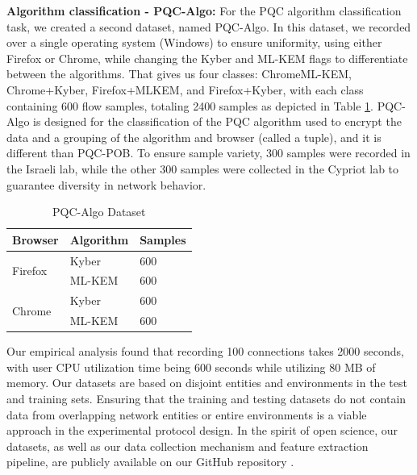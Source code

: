 \documentclass[10pt,journal]{IEEEtran}%
\begin{document}
    
     \textbf{Algorithm classification - PQC-Algo:} For the PQC algorithm classification task, we created a second dataset, named PQC-Algo. In this dataset, we recorded over a single operating system (Windows) to ensure uniformity, using either Firefox or Chrome, while changing the Kyber and ML-KEM flags to differentiate between the algorithms. That gives us four classes: ChromeML-KEM, Chrome+Kyber, Firefox+MLKEM, and Firefox+Kyber, with each class containing 600 flow samples, totaling 2400 samples as depicted in Table \ref{tab:pqcalgo}.    
    PQC-Algo is designed for the classification of the PQC algorithm used to encrypt the data and a grouping of the algorithm and browser (called a tuple), and it is different than PQC-POB. To ensure sample variety, 300 samples were recorded in the Israeli lab, while the other 300 samples were collected in the Cypriot lab to guarantee diversity in network behavior.

\begin{table}[h]
\centering
\caption{PQC-Algo Dataset}
\vspace{1.5mm}

\begin{tabular}{|p{2cm}|p{2cm}|p{1.2cm}|}
\hline
\textbf{Browser}      & \textbf{Algorithm} & \textbf{Samples}\\ \hline \hline
\multirow{2}{*}{Firefox} & Kyber & 600 \\ \cline{2-3}
                         & ML-KEM & 600 \\ \hline
\multirow{2}{*}{Chrome}  & Kyber & 600 \\ \cline{2-3}
                         & ML-KEM & 600 \\ \hline
\end{tabular}
\label{tab:pqcalgo}
\end{table}

Our empirical analysis found that recording 100 connections takes 2000 seconds, with user CPU utilization time being 600 seconds while utilizing 80 MB of memory. Our datasets are based on disjoint entities and environments in the test and training sets. Ensuring that the training and testing datasets do not contain data from overlapping network entities or entire environments is a viable approach in the experimental protocol design.
In the spirit of open science, our datasets, as well as our data collection mechanism and feature extraction pipeline, are publicly available on our GitHub repository \cite{PQBench}.
\end{document}
